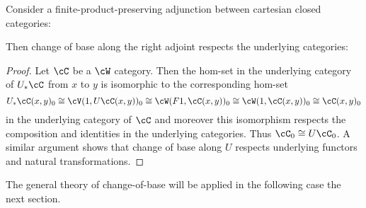 \begin{lemma}\label{lem:right-of-monoidal-adj-ucats}
   Consider a finite-product-preserving adjunction between cartesian closed categories:
\begin{center}
\end{center}
Then change of base along the right adjoint respects the underlying categories:
\begin{center}
\end{center}
\end{lemma}
\begin{proof}
Let $\cC$ be a $\cW$ category. Then the hom-set in the underlying category of $U_*\cC$ from $x$ to $y$ is isomorphic to the corresponding hom-set
\[ U_*\cC(x,y)_0 \cong \cV(1, U\cC(x,y))_0 \cong \cW(F1,\cC(x,y))_0 \cong \cW(1,\cC(x,y))_0 \cong \cC(x,y)_0\]
in the underlying category of $\cC$ and moreover this isomorphism respects the composition and identities in the underlying categories. Thus $\cC_0 \cong U\cC_0$. A similar argument shows that change of base along $U$ respects underlying functors and natural transformations.
\end{proof}


The general theory of change-of-base will be applied in the following case the next section.


